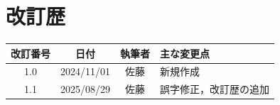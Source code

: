 \documentclass[uplatex,dvipdfmx,a4j,11  pt]{jsarticle}
\begin{document}



\newpage

\section*{改訂歴}

\begin{center}
  \begin{tabular}{cccl}
    \hline
    改訂番号 & 日付 & 執筆者 & 主な変更点\\
    \hline \hline
    1.0 & 2024/11/01 & 佐藤 & 新規作成\\
    1.1 & 2025/08/29 & 佐藤 & 誤字修正，改訂歴の追加\\
    \hline
  \end{tabular}
\end{center}
\end{document}
